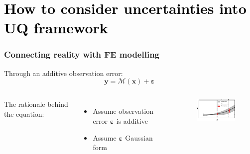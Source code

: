 
\section{\textcolor{black}{How to consider uncertainties into UQ framework}}
\begin{frame}\frametitle{Connecting reality with FE modelling}
\begin{block}{Through an additive observation error:}
  \begin{equation}
 \label{eq: modelling_discrepancy}
 \boldsymbol{y} = \mathcal{M}(\boldsymbol{x}) + \boldsymbol{\varepsilon}
\end{equation}  
\end{block}
\begin{columns}
The rationale behind the equation:
\begin{itemize}
    \item Assume observation error $\boldsymbol{\varepsilon}$ is additive
    \item Assume $\boldsymbol{\varepsilon}$ Gaussian form
\end{itemize}
\begin{figure}[!ht]       
\includegraphics[scale=3]{figures/figure-likelihood.pdf}
\end{figure}
\end{columns}
 
\end{frame}
